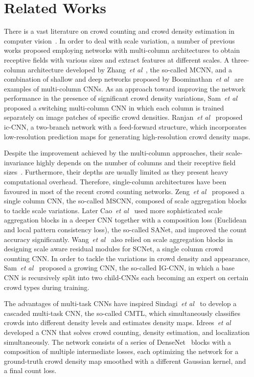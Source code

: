\documentclass{bmvc2k}
\def\etal{\emph{et al}\bmvaOneDot}
\begin{document}
\section{Related Works}\label{sec:relatedWorks} 
There is a vast literature on crowd counting and crowd density estimation in computer vision~\cite{Sindagi2018}. 
In order to deal with scale variation, a number of previous works proposed employing networks with multi-column architectures to obtain receptive fields with various sizes and extract features at different scales.
A three-column architecture developed by Zhang~\etal~\cite{Zhang2016}, the so-called MCNN, and a combination of shallow and deep networks proposed by Boominathan~\etal~\cite{Boominathan2016} are examples of multi-column CNNs.
As an approach toward improving the network performance in the presence of significant crowd density variations, Sam~\etal~\cite{Sam2017} proposed a switching multi-column CNN in which each column is trained separately on image patches of specific crowd densities. 
Ranjan~\etal~\cite{Ranjan2018} proposed ic-CNN, a two-branch network with a feed-forward structure, which incorporates low-resolution prediction maps for generating high-resolution crowd density maps.

Despite the improvement achieved by the multi-column approaches, their scale-invariance highly depends on the number of columns and their receptive field sizes~\cite{Sindagi2018}. Furthermore, their depths are usually limited as they present heavy computational overhead. Therefore, single-column architectures have been favoured in most of the recent crowd counting networks.
Zeng~\etal~\cite{Zeng2017} proposed a single column CNN, the so-called MSCNN, composed of scale aggregation blocks to tackle scale variations. Later Cao~\etal~\cite{Cao2018} used more sophisticated scale aggregation blocks in a deeper CNN together with a composition loss (Euclidean and local pattern consistency loss), the so-called SANet, and improved the count accuracy significantly.
Wang~\etal~\cite{Wang2018} also relied on scale aggregation blocks in designing scale aware residual modules for SCNet, a single column crowd counting CNN.
In order to tackle the variations in crowd density and appearance, Sam~\etal~\cite{Sam2018} proposed a growing CNN, the so-called IG-CNN, in which a base CNN is recursively split into two child-CNNs each becoming an expert on certain crowd types during training.

The advantages of multi-task CNNs have inspired Sindagi~\etal~\cite{Sindagi2017} to develop a cascaded multi-task CNN, the so-called CMTL, which simultaneously classifies crowds into different density levels and estimates density maps. 
Idrees~\etal~\cite{Idrees2018} developed a CNN that solves crowd counting, density estimation, and localization simultaneously. The network consists of a series of DenseNet~\cite{Huang2017} blocks with a composition of multiple intermediate losses, each optimizing the network for a ground-truth crowd density map smoothed with a different Gaussian kernel, and a final count loss.
\end{document}
